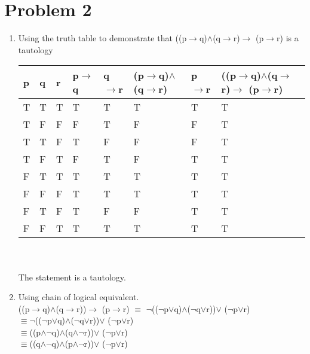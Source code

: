 \documentclass[12pt,letterpaper]{article}
\begin{document}
\section*{Problem 2}
\begin{enumerate}
  \item Using the truth table to demonstrate that ((p\({\rightarrow}\)q)\({\land}\)(q\({\rightarrow}\)r)\({\rightarrow}\) (p\({\rightarrow}\)r)
  is a tautology
  \begin{tabular}{ | m{1cm} | m{1cm}| m{1cm} | m{1cm} | m{1cm}| m{3cm} | m{1cm} | m{5cm}|}
    \hline
    \rowcolor{gray}
    p & q & r &p\({\rightarrow}\)q& q\({\rightarrow}\)r&(p\({\rightarrow}\)q)\({\land}\)(q\({\rightarrow}\)r)&p\({\rightarrow}\)r& ((p\({\rightarrow}\)q)\({\land}\)(q\({\rightarrow}\)r)\({\rightarrow}\) (p\({\rightarrow}\)r)\\
    \hline
    T & T & T & T & T & T & T & T\\
    \hline
    T & F & F & F & T & F & F & T\\
    \hline
    T & T & F & T & F & F & F & T\\
    \hline
    T & F & T & F & T & F & T & T\\
    \hline
    F & T & T & T & T & T & T & T\\
    \hline
    F & F & F & T & T & T & T & T \\
    \hline
    F & T & F & T & F & F & T & T\\
    \hline
    F & F & T & T & T & T & T & T\\
    \hline
  \end{tabular}\\\\
  The statement is a tautology.
  \item Using chain of logical equivalent.\\
  ((p\({\rightarrow}\)q)\({\land}\)(q\({\rightarrow}\)r))\({\rightarrow}\) (p\({\rightarrow}\)r) \({\equiv}\)
  \({\neg}\)((\({\neg}\)p\({\lor}\)q)\({\land}\)(\({\neg}\)q\({\lor}\)r))\({\lor}\) (\({\neg}\)p\({\lor}\)r)\\
  \({\equiv}\)\({\neg}\)((\({\neg}\)p\({\lor}\)q)\({\land}\)(\({\neg}\)q\({\lor}\)r))\({\lor}\) (\({\neg}\)p\({\lor}\)r)\\
  \({\equiv}\)((p\({\land}\)\({\neg}\)q)\({\land}\)(q\({\land}\)\({\neg}\)r))\({\lor}\) (\({\neg}\)p\({\lor}\)r)\\
  \({\equiv}\)((q\({\land}\)\({\neg}\)q)\({\land}\)(p\({\land}\)\({\neg}\)r))\({\lor}\) (\({\neg}\)p\({\lor}\)r)\\

\end{enumerate}
\end{document}
